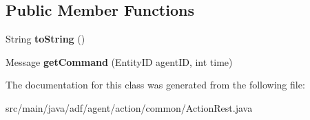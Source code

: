 \subsection*{Public Member Functions}
\begin{DoxyCompactItemize}
\item 
\hypertarget{classadf_1_1agent_1_1action_1_1common_1_1ActionRest_a739ba879f9ae9da9a46db83914026ff4}{}\label{classadf_1_1agent_1_1action_1_1common_1_1ActionRest_a739ba879f9ae9da9a46db83914026ff4} 
String {\bfseries to\+String} ()
\item 
\hypertarget{classadf_1_1agent_1_1action_1_1common_1_1ActionRest_a48270767d6992f55bd6184e942a6436b}{}\label{classadf_1_1agent_1_1action_1_1common_1_1ActionRest_a48270767d6992f55bd6184e942a6436b} 
Message {\bfseries get\+Command} (Entity\+ID agent\+ID, int time)
\end{DoxyCompactItemize}


The documentation for this class was generated from the following file\+:\begin{DoxyCompactItemize}
\item 
src/main/java/adf/agent/action/common/Action\+Rest.\+java\end{DoxyCompactItemize}
